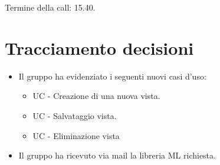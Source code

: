Termine della call: 15.40.

\section{Tracciamento decisioni}

\begin{itemize}
	\item Il gruppo ha evidenziato i seguenti nuovi casi d'uso:
	\begin{itemize}
		\item UC - Creazione di una nuova vista.
		\item UC - Salvataggio vista.
		\item UC - Eliminazione vista
	\end{itemize}
	\item Il gruppo ha ricevuto via mail la libreria ML richiesta.
\end{itemize}